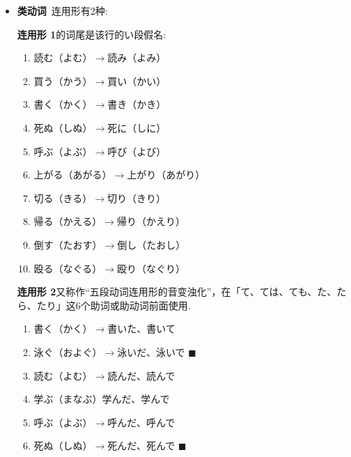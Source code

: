\begin{itemize}
    \item {\bfseries \I 类动词}\, 连用形有2种:
    
    {\bfseries 连用形 1}的词尾是该行的い段假名:
    \begin{multicols}{2}
        \begin{enumerate}
            \item 読む（よむ）$\longrightarrow$読み（よみ）
            \item 買う（かう）$\longrightarrow$買い（かい）
            \item 書く（かく）$\longrightarrow$書き（かき）
            \item 死ぬ（しぬ）$\longrightarrow$死に（しに）
            \item 呼ぶ（よぶ）$\longrightarrow$呼び（よび）
            \item 上がる（あがる）$\longrightarrow$上がり（あがり）
            \item 切る（きる）$\longrightarrow$切り（きり）
            \item 帰る（かえる）$\longrightarrow$帰り（かえり）
            \item 倒す（たおす）$\longrightarrow$倒し（たおし）
            \item 殴る（なぐる）$\longrightarrow$殴り（なぐり）
        \end{enumerate}

    \end{multicols}

    {\bfseries 连用形 2}又称作“五段动词连用形的音变浊化”，在「て、ては、ても、た、たら、たり」这6个助词或助动词前面使用.

    \begin{multicols}{2}
        \begin{enumerate}
            \item 書く（かく）$\longrightarrow$書いた、書いて
            \item 泳ぐ（およぐ）$\longrightarrow$泳いだ、泳いで $\blacksquare$ 

            \item 読む（よむ）$\longrightarrow$読んだ、読んで
            \item 学ぶ（まなぶ）学んだ、学んで
            \item 呼ぶ（よぶ）$\longrightarrow$呼んだ、呼んで
            \item 死ぬ（しぬ）$\longrightarrow$死んだ、死んで
            $\blacksquare$ 
            

\end{enumerate}
\end{multicols}
\end{itemize}
